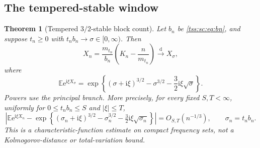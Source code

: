 \documentclass[11pt]{article}
\newtheorem{theorem}{Theorem}[section]
\theoremstyle{remark}\newtheorem{remark}[theorem]{Remark}
\theoremstyle{definition}\newtheorem{definition}[theorem]{Definition}
\newcommand{\ii}{\mathrm i}
\newcommand{\e}{\mathrm e}
\newcommand{\E}{\mathbb E}
\newcommand{\dto}{\xrightarrow{\mathrm d}}
\begin{document}
\subsection{The tempered-stable window}
\begin{theorem}[Tempered $3/2$-stable block count]\label{tss:sc:thm:tempered}
Let $b_n$ be \eqref{tss:sc:eq:bn}, and suppose $t_n\geq0$ with $t_nb_n\to\sigma\in[0,\infty)$. Then
\begin{equation}\label{tss:sc:eq:X}
 X_n=\frac{m_{t_n}}{b_n}\left(K_n-\frac n{m_{t_n}}\right)\dto X_\sigma,
\end{equation}
where
\begin{equation}\label{tss:sc:eq:temperedcf}
 \boxed{\displaystyle
 \E\e^{\ii\xi X_\sigma}
 =\exp\left\{(\sigma+\ii\xi)^{3/2}-\sigma^{3/2}
                      -\frac32\ii\xi\sqrt\sigma\right\}.}
\end{equation}
Powers use the principal branch. More precisely, for every fixed $S,T<\infty$, uniformly for $0\leq t_nb_n\leq S$ and $|\xi|\leq T$,
\begin{equation}\label{tss:sc:eq:cfrate}
 \left|\E\e^{\ii\xi X_n}
 -\exp\left\{(\sigma_n+\ii\xi)^{3/2}-\sigma_n^{3/2}
             -\tfrac32\ii\xi\sqrt{\sigma_n}\right\}\right|
 =O_{S,T}(n^{-1/3}),\qquad \sigma_n=t_nb_n.
\end{equation}
This is a characteristic-function estimate on compact frequency sets, not a Kolmogorov-distance or total-variation bound.
\end{theorem}
\end{document}
